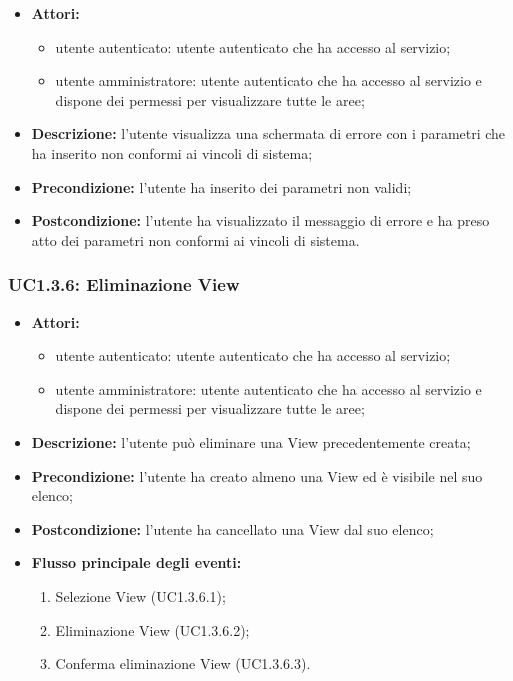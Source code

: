 \begin{itemize}
    \item \textbf{Attori:}
    \begin{itemize}
    	\item utente autenticato: utente autenticato che ha accesso al servizio;
    	\item utente amministratore: utente autenticato che ha accesso al servizio e dispone dei permessi per visualizzare tutte le aree;
	\end{itemize}
    \item \textbf{Descrizione:} l'utente visualizza una schermata di errore con i parametri che ha inserito non conformi ai vincoli di sistema;
    \item \textbf{Precondizione:} l'utente ha inserito dei parametri non validi;
    \item \textbf{Postcondizione:} l'utente ha visualizzato il messaggio di errore e ha preso atto dei parametri non conformi ai vincoli di sistema.
\end{itemize}

\subsubsection{UC1.3.6: Eliminazione View}

\begin{itemize}
    \item \textbf{Attori:}
    \begin{itemize}
    	\item utente autenticato: utente autenticato che ha accesso al servizio;
    	\item utente amministratore: utente autenticato che ha accesso al servizio e dispone dei permessi per visualizzare tutte le aree;
	\end{itemize}
    \item \textbf{Descrizione:} l'utente può eliminare una View precedentemente creata;
    \item \textbf{Precondizione:} l'utente ha creato almeno una View ed è visibile nel suo elenco;
    \item \textbf{Postcondizione:} l'utente ha cancellato una View dal suo elenco;
    \item \textbf{Flusso principale degli eventi:}
    \begin{enumerate}
        \item Selezione View (UC1.3.6.1);
        \item Eliminazione View (UC1.3.6.2);
        \item Conferma eliminazione View (UC1.3.6.3).
    \end{enumerate}
\end{itemize}

